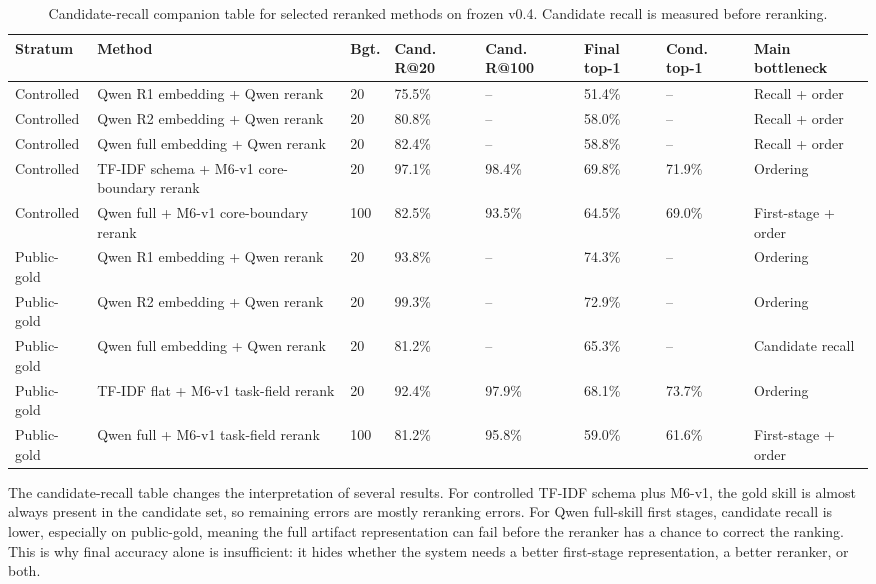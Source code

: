 \begin{table}[h]
\centering
\tiny
\setlength{\tabcolsep}{1.5pt}
\begin{tabular}{p{}p{}p{}p{}p{}p{}p{}p{}}
\toprule
Stratum & Method & Bgt. & Cand. R@20 & Cand. R@100 & Final top-1 & Cond. top-1 & Main bottleneck \\
\midrule
Controlled & Qwen R1 embedding + Qwen rerank & 20 & 75.5\% & -- & 51.4\% & -- & Recall + order \\
Controlled & Qwen R2 embedding + Qwen rerank & 20 & 80.8\% & -- & 58.0\% & -- & Recall + order \\
Controlled & Qwen full embedding + Qwen rerank & 20 & 82.4\% & -- & 58.8\% & -- & Recall + order \\
Controlled & TF-IDF schema + M6-v1 core-boundary rerank & 20 & 97.1\% & 98.4\% & 69.8\% & 71.9\% & Ordering \\
Controlled & Qwen full + M6-v1 core-boundary rerank & 100 & 82.5\% & 93.5\% & 64.5\% & 69.0\% & First-stage + order \\
\midrule
Public-gold & Qwen R1 embedding + Qwen rerank & 20 & 93.8\% & -- & 74.3\% & -- & Ordering \\
Public-gold & Qwen R2 embedding + Qwen rerank & 20 & 99.3\% & -- & 72.9\% & -- & Ordering \\
Public-gold & Qwen full embedding + Qwen rerank & 20 & 81.2\% & -- & 65.3\% & -- & Candidate recall \\
Public-gold & TF-IDF flat + M6-v1 task-field rerank & 20 & 92.4\% & 97.9\% & 68.1\% & 73.7\% & Ordering \\
Public-gold & Qwen full + M6-v1 task-field rerank & 100 & 81.2\% & 95.8\% & 59.0\% & 61.6\% & First-stage + order \\
\bottomrule
\end{tabular}
\caption{Candidate-recall companion table for selected reranked methods on frozen v0.4. Candidate recall is measured before reranking.}
\label{tab:candidate-recall-companion-v04}
\end{table}

The candidate-recall table changes the interpretation of several results. For controlled TF-IDF schema plus M6-v1, the gold skill is almost always present in the candidate set, so remaining errors are mostly reranking errors. For Qwen full-skill first stages, candidate recall is lower, especially on public-gold, meaning the full artifact representation can fail before the reranker has a chance to correct the ranking. This is why final accuracy alone is insufficient: it hides whether the system needs a better first-stage representation, a better reranker, or both.

